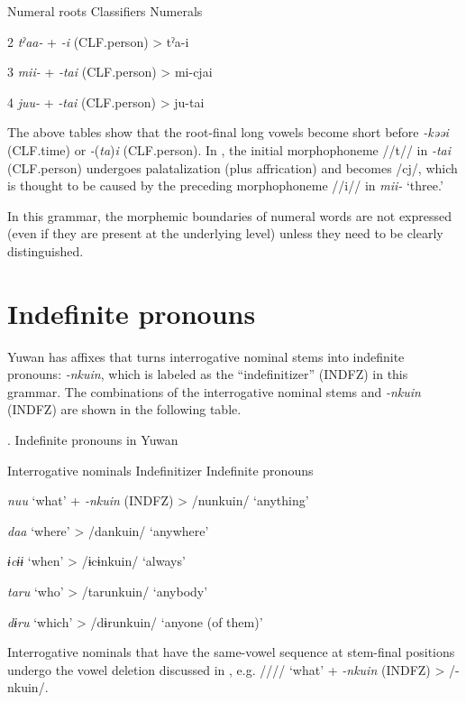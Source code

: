   Numeral roots    Classifiers    Numerals

2  \textit{tˀaa-}  +  \textit{{}-i} (CLF.person)  >  tˀa-i

3  \textit{mii-}  +  \textit{{}-tai} (CLF.person)  >  mi-cjai

4  \textit{juu-}  +  \textit{{}-tai} (CLF.person)  >  ju-tai

The above tables show that the root-final long vowels become short before \textit{{}-kəəi} (CLF.time) or \textit{{}-}(\textit{ta})\textit{i} (CLF.person). In , the initial morphophoneme //t// in \textit{{}-tai} (CLF.person) undergoes palatalization (plus affrication) and becomes /cj/, which is thought to be caused by the preceding morphophoneme //i// in \textit{mii-} ‘three.’

In this grammar, the morphemic boundaries of numeral words are not expressed (even if they are present at the underlying level) unless they need to be clearly distinguished.

\section{Indefinite pronouns}

Yuwan has affixes that turns interrogative nominal stems into indefinite pronouns: \textit{{}-nkuin}, which is labeled as the “indefinitizer” (INDFZ) in this grammar. The combinations of the interrogative nominal stems and \textit{-nkuin} (INDFZ) are shown in the following table.

\begin{styleBeschriftung}
\textmd{}\textmd{. Indefinite pronouns in Yuwan}
\end{styleBeschriftung}

Interrogative nominals    Indefinitizer    Indefinite pronouns

\textit{nuu}  ‘what’  +  \textit{{}-nkuin} (INDFZ)  >  /nunkuin/  ‘anything’

\textit{daa}  ‘where’      >  /dankuin/  ‘anywhere’

\textit{ɨcɨɨ}  ‘when’      >  /ɨcɨnkuin/  ‘always’

\textit{taru}  ‘who’      >  /tarunkuin/  ‘anybody’

\textit{dɨru}  ‘which’      >  /dɨrunkuin/  ‘anyone (of them)’

Interrogative nominals that have the same-vowel sequence at stem-final positions undergo the vowel deletion discussed in , e.g. //// ‘what’ + \textit{{}-nkuin} (INDFZ) > /-nkuin/.


